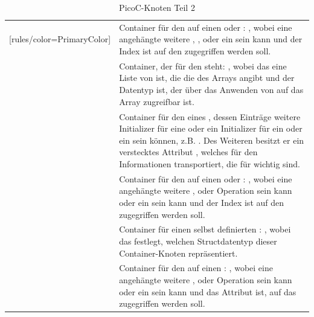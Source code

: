 \begin{table}[H]
\begin{NiceTabular}{X[7]X[10]}[rules/color=PrimaryColor]
 & Container für den  auf einen  oder : , wobei  eine angehängte weitere , ,  oder ein  sein kann und  der Index ist auf den zugegriffen werden soll. \\
 & Container, der für den  steht: , wobei das   eine Liste von  ist, die die  des Arrays angibt und  der {Datentyp} ist, der über das Anwenden von  auf das Array zugreifbar ist. \\
 & Container für den  eines , dessen Einträge  weitere Initializer für eine  oder ein Initializer für ein  oder ein  sein können, z.B. . Des Weiteren besitzt er ein \textcolor{gray!90!black}{verstecktes Attribut} , welches für den  Informationen transportiert, die für  wichtig sind. \\
 & Container für den  auf einen  oder : , wobei  eine angehängte weitere ,  oder  Operation sein kann oder ein  sein kann und  der Index ist auf den zugegriffen werden soll. \\
   & Container für einen selbst definierten : , wobei das   festlegt, welchen  Structdatentyp dieser Container-Knoten repräsentiert. \\
   & Container für den  auf einen : , wobei  eine angehängte weitere ,  oder  Operation sein kann oder ein  sein kann und  das Attribut ist, auf das zugegriffen werden soll. \\
  \bottomrule
\end{NiceTabular}
\caption{PicoC-Knoten Teil 2}
\label{tab:picoc_knoten_teil_2}
\end{table}

